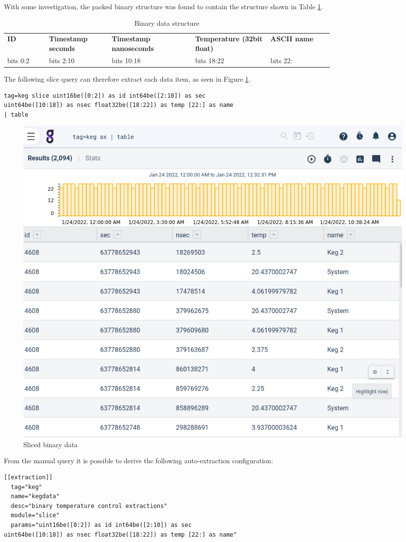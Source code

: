 With some investigation, the packed binary structure was found to
contain the structure shown in Table \ref{table:keg-structure}.

\begin{table}
\begin{tabular}{p{0.1\linewidth}p{0.15\linewidth}p{0.2\linewidth}p{0.18\linewidth}p{0.15\linewidth}}
\hline
\textbf{ID} & \textbf{Timestamp seconds} & \textbf{Timestamp nanoseconds} & \textbf{Temperature (32bit float)} & \textbf{ASCII name} \\
{bits 0:2} & {bits 2:10} & {bits 10:18} & {bits 18:22} & {bits 22:} \\
\hline
\end{tabular}
\caption{Binary data structure}
\label{table:keg-structure}
\end{table}

The following slice query can therefore extract each data item, as seen in Figure \ref{fig:sliced-keg}.

\begin{Verbatim}[breaklines=true]
tag=keg slice uint16be([0:2]) as id int64be([2:10]) as sec 
uint64be([10:18]) as nsec float32be([18:22]) as temp [22:] as name
| table
\end{Verbatim}

\begin{figure}
	\includegraphics[width=0.65\linewidth]{images/sliced-keg.png}
	\caption{Sliced binary data}
	\label{fig:sliced-keg}
\end{figure}

From the manual query it is possible to derive the following
auto-extraction configuration:

\begin{Verbatim}[breaklines=true]
[[extraction]]
  tag="keg"
  name="kegdata"
  desc="binary temperature control extractions"
  module="slice"
  params="uint16be([0:2]) as id int64be([2:10]) as sec 
uint64be([10:18]) as nsec float32be([18:22]) as temp [22:] as name"
\end{Verbatim}


